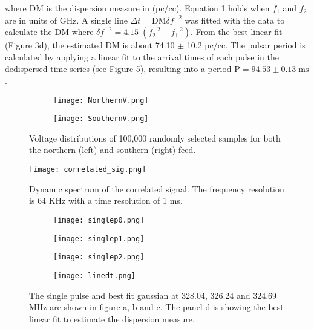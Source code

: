 \documentclass[12pt]{article}
\begin{document}
\begin{multicols}{2}
where DM is the dispersion measure in (pc/cc). Equation 1 holds when $f_1$ and $f_2$ are in units of GHz. A single line $\Delta t = \mbox{DM}\delta f^{-2}$   was fitted with the data to calculate the DM where $\delta f^{-2}= 4.15 \;(f_2^{-2} - f_1^{-2})$. From the best linear fit (Figure 3d), the estimated DM is about 74.10 $\pm$ 10.2 pc/cc. The pulsar period is calculated by applying a linear fit to the arrival times of each pulse in the dedispersed time series (see Figure 5), resulting into a period $\mbox{P} = 94.53 \pm 0.13 \; \mbox{ms}$. 
     
\end{multicols}

\newpage
\vspace{0.2in}
\begin{figure}[h]
  \centering
  \begin{subfigure}[b]{0.49\textwidth}
  	\centering
    \texttt{[image: NorthernV.png]}
    \label{fig:vnorth}
  \end{subfigure}
  \begin{subfigure}[b]{0.49\textwidth}
  	\centering
    \texttt{[image: SouthernV.png]}
    \label{fig:vsouth}
  \end{subfigure}
  \label{fig:voltage}
  \caption{Voltage distributions of 100,000 randomly selected samples for both the northern (left) and southern (right) feed.}
\end{figure}

\begin{figure}[ht]
    \texttt{[image: correlated\_sig.png]} 
  	\label{fig:dscorr}  
  	\caption{Dynamic spectrum of the correlated signal. The frequency resolution is 64 KHz with a time resolution of 1 ms.}
\end{figure}

\newpage
\begin{figure}
\centering
  \begin{subfigure}[h]{0.49\textwidth}
  	\centering
    \texttt{[image: singlep0.png]}
    \caption{}
  \end{subfigure}
  \begin{subfigure}[h]{0.49\textwidth}
  	\centering
    \texttt{[image: singlep1.png]}
    \caption{}
  \end{subfigure}
   \begin{subfigure}[h]{0.49\textwidth}
  	\centering
    \texttt{[image: singlep2.png]}
    \caption{}
  \end{subfigure}
   \begin{subfigure}[h]{0.49\textwidth}
  	\centering
    \texttt{[image: linedt.png]} 
    \caption{}
  \end{subfigure}
  \caption{The single pulse and best fit gaussian at 328.04, 326.24 and 324.69 MHz are shown in figure a, b and c. The panel d is showing the best linear fit to estimate the dispersion measure.}
\end{figure}
\end{document}
